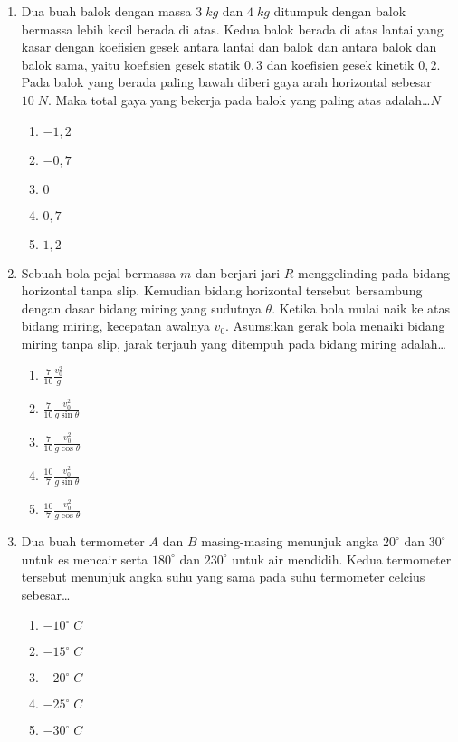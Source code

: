 \documentclass[A4,12PT, english, twocolumn]{journal}
\begin{document}
\begin{enumerate}
\item Dua buah balok dengan massa $3 \; kg$ dan $4 \; kg$ ditumpuk dengan balok bermassa lebih kecil berada di atas. Kedua balok berada di atas lantai yang kasar dengan koefisien gesek antara lantai dan balok dan antara balok dan balok sama, yaitu koefisien gesek statik $0,3$ dan koefisien gesek kinetik $0,2$. Pada balok yang berada paling bawah diberi gaya arah horizontal sebesar $10 \; N$. Maka total gaya yang bekerja pada balok yang paling atas adalah\dots$N$
    \begin{enumerate}
        \item $-1,2$
        \item $-0,7$
        \item $0$
        \item $0,7$
        \item $1,2$
    \end{enumerate}
    
\item Sebuah bola pejal bermassa $m$ dan berjari-jari $R$ menggelinding pada bidang horizontal tanpa slip. Kemudian bidang horizontal tersebut bersambung dengan dasar bidang miring yang sudutnya $\theta$. Ketika bola mulai naik ke atas bidang miring, kecepatan awalnya $v_0$. Asumsikan gerak bola menaiki bidang miring tanpa slip, jarak terjauh yang ditempuh pada bidang miring adalah\dots
    \begin{enumerate}
        \item $\frac{7}{10} \frac{v_0^2}{g}$
        \item $\frac{7}{10} \frac{v_0^2}{g \sin{\theta}}$
        \item $\frac{7}{10} \frac{v_0^2}{g \cos{\theta}}$
        \item $\frac{10}{7} \frac{v_0^2}{g \sin{\theta}}$
        \item $\frac{10}{7} \frac{v_0^2}{g \cos{\theta}}$
    \end{enumerate}

\item Dua buah termometer $A$ dan $B$ masing-masing menunjuk angka $20^\circ$ dan $30^\circ$ untuk es mencair serta $180^\circ$ dan $230^\circ$ untuk air mendidih. Kedua termometer tersebut menunjuk angka suhu yang sama pada suhu termometer celcius sebesar\dots
    \begin{enumerate}
        \item $-10^\circ \; C$
        \item $-15^\circ \; C$
        \item $-20^\circ \; C$
        \item $-25^\circ \; C$
        \item $-30^\circ \; C$
    \end{enumerate}
    

\end{enumerate}
\end{document}
